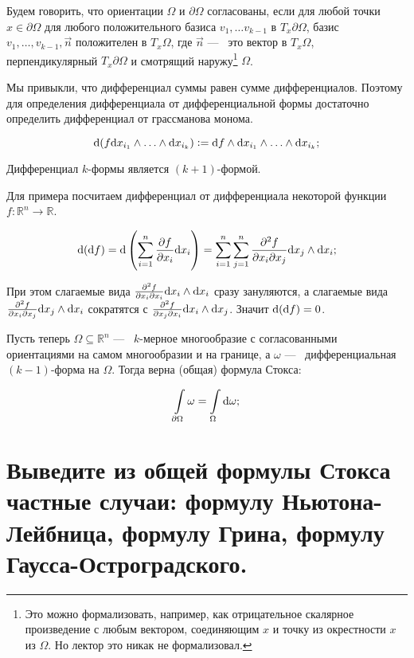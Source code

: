\documentclass{article}
\begin{document}
	\begin{definition}
		Будем говорить, что ориентации $\Omega$ и $\partial \Omega$ согласованы, если для любой точки $x \in \partial \Omega$ для любого положительного базиса $v_1, \ldots v_{k - 1}$ в $T_x \partial \Omega$, базис $v_1, \ldots, v_{k - 1}, \vec{n}$ положителен в $T_x \Omega$, где $\vec{n}$ ---~ это вектор в $T_x \Omega$, перпендикулярный $T_x \partial \Omega$ и смотрящий наружу\footnote{Это можно формализовать, например, как отрицательное скалярное произведение с любым вектором, соединяющим $x$ и точку из окрестности $x$ из $\Omega$. Но лектор это никак не формализовал.} $\Omega$.
	\end{definition}

	Мы привыкли, что дифференциал суммы равен сумме дифференциалов. Поэтому для определения дифференциала от дифференциальной формы достаточно определить дифференциал от грассманова монома.

	\[ \mathrm{d}(f \mathrm{d} x_{i_1} \land \ldots \land \mathrm{d} x_{i_k}) := \mathrm{d} f \land \mathrm{d} x_{i_1} \land \ldots \land \mathrm{d} x_{i_k}; \]

	\begin{remark}
		Дифференциал $k$-формы является $(k + 1)$-формой.
	\end{remark}

	Для примера посчитаем дифференциал от дифференциала некоторой функции $f:\mathbb{R}^n \to \mathbb{R}$.

	\[\mathrm{d} (\mathrm{d} f) = \mathrm{d} \left(\sum_{i = 1}^n \frac{\partial f}{\partial x_i}\mathrm{d} x_i \right) = \sum_{i = 1}^n \sum_{j = 1}^n \frac{\partial^2 f}{\partial x_i \partial x_j} \mathrm{d} x_j \land \mathrm{d} x_i; \]

	При этом слагаемые вида $\frac{\partial^2 f}{\partial x_i \partial x_i} \mathrm{d} x_i \land \mathrm{d} x_i$ сразу зануляются, а слагаемые вида $\frac{\partial^2 f}{\partial x_i \partial x_j} \mathrm{d} x_j \land \mathrm{d} x_i$ сократятся с $\frac{\partial^2 f}{\partial x_j \partial x_i} \mathrm{d} x_i \land \mathrm{d} x_j$. Значит $\mathrm{d}(\mathrm{d} f) = 0$.

	Пусть теперь $\Omega \subseteq \mathbb{R}^n$ ---~ $k$-мерное многообразие с согласованными ориентациями на самом многообразии и на границе, а $\omega$ ---~ дифференциальная $(k - 1)$-форма на $\Omega$. Тогда верна (общая) формула Стокса:

	\[ \int\limits_{\partial \Omega} \omega = \int\limits_\Omega \mathrm{d} \omega; \] 

	\section{Выведите из общей формулы Стокса частные случаи: формулу Ньютона-Лейбница, формулу Грина, формулу Гаусса-Остроградского.}
\end{document}
